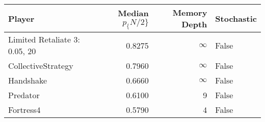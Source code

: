 \begin{tabular}{lrrl}
\toprule
                        Player &  Median $p_\{N/2\}$ &  Memory Depth & Stochastic \\
\midrule
 Limited Retaliate 3: 0.05, 20 &            0.8275 &            \(\infty\) &      False \\
            CollectiveStrategy &            0.7960 &            \(\infty\) &      False \\
                     Handshake &            0.6660 &            \(\infty\) &      False \\
                      Predator &            0.6100 &             9 &      False \\
                     Fortress4 &            0.5790 &             4 &      False \\
\bottomrule
\end{tabular}
